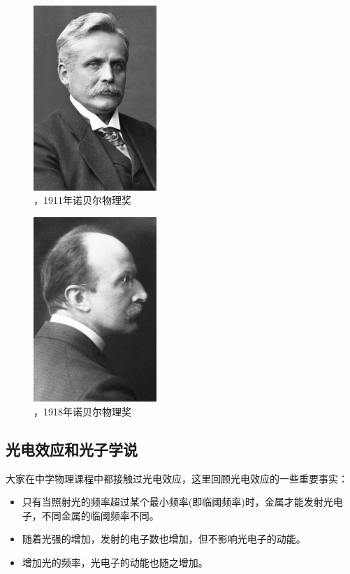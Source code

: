 \begin{figure}[!ht]
\centering
\includegraphics[height=7cm]{pic/Wien.jpg}
\caption{\wein，1911年诺贝尔物理奖}
\end{figure}

\begin{figure}[!ht]
\centering
\includegraphics[height=7cm]{pic/Planck.jpg}
\caption{\planck，1918年诺贝尔物理奖}
\end{figure}



\subsection{光电效应和光子学说}
大家在中学物理课程中都接触过光电效应，这里回顾光电效应的一些重要事实：
\begin{itemize}
\item 只有当照射光的频率超过某个最小频率(即临阈频率)时，金属才能发射光电子，不同金属的临阈频率不同。
\item 随着光强的增加，发射的电子数也增加，但不影响光电子的动能。
\item 增加光的频率，光电子的动能也随之增加。
\end{itemize}

